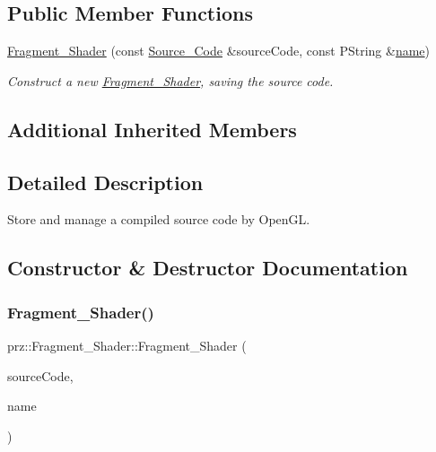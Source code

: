 \subsection*{Public Member Functions}
\begin{DoxyCompactItemize}
\item 
\mbox{\hyperlink{classprz_1_1_fragment___shader_a987c13b68788b69b12d404946eb7dc76}{Fragment\+\_\+\+Shader}} (const \mbox{\hyperlink{classprz_1_1_source___code}{Source\+\_\+\+Code}} \&source\+Code, const P\+String \&\mbox{\hyperlink{classprz_1_1_shader_a2ba459fe4dc556e94ab73df91d2c0a4e}{name}})
\begin{DoxyCompactList}\small\item\em Construct a new \mbox{\hyperlink{classprz_1_1_fragment___shader}{Fragment\+\_\+\+Shader}}, saving the source code. \end{DoxyCompactList}\end{DoxyCompactItemize}
\subsection*{Additional Inherited Members}


\subsection{Detailed Description}
Store and manage a compiled source code by Open\+GL. 

\subsection{Constructor \& Destructor Documentation}
\mbox{\label{classprz_1_1_fragment___shader_a987c13b68788b69b12d404946eb7dc76}} 
\subsubsection{\texorpdfstring{Fragment\_Shader()}{Fragment\_Shader()}}
{\footnotesize\ttfamily prz\+::\+Fragment\+\_\+\+Shader\+::\+Fragment\+\_\+\+Shader (\begin{DoxyParamCaption}\item[{const \mbox{\hyperlink{classprz_1_1_source___code}{Source\+\_\+\+Code}} \&}]{source\+Code,  }\item[{const P\+String \&}]{name }\end{DoxyParamCaption})\hspace{0.3cm}{\ttfamily [inline]}}



